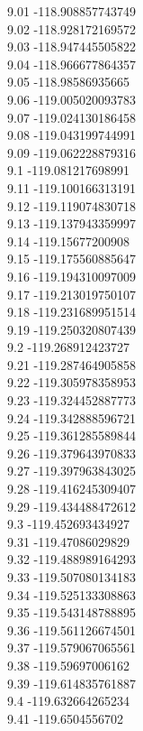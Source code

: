 {9.01	-118.908857743749\\
9.02	-118.928172169572\\
9.03	-118.947445505822\\
9.04	-118.966677864357\\
9.05	-118.98586935665\\
9.06	-119.005020093783\\
9.07	-119.024130186458\\
9.08	-119.043199744991\\
9.09	-119.062228879316\\
9.1	-119.081217698991\\
9.11	-119.100166313191\\
9.12	-119.119074830718\\
9.13	-119.137943359997\\
9.14	-119.15677200908\\
9.15	-119.175560885647\\
9.16	-119.194310097009\\
9.17	-119.213019750107\\
9.18	-119.231689951514\\
9.19	-119.250320807439\\
9.2	-119.268912423727\\
9.21	-119.287464905858\\
9.22	-119.305978358953\\
9.23	-119.324452887773\\
9.24	-119.342888596721\\
9.25	-119.361285589844\\
9.26	-119.379643970833\\
9.27	-119.397963843025\\
9.28	-119.416245309407\\
9.29	-119.434488472612\\
9.3	-119.452693434927\\
9.31	-119.47086029829\\
9.32	-119.488989164293\\
9.33	-119.507080134183\\
9.34	-119.525133308863\\
9.35	-119.543148788895\\
9.36	-119.561126674501\\
9.37	-119.579067065561\\
9.38	-119.59697006162\\
9.39	-119.614835761887\\
9.4	-119.632664265234\\
9.41	-119.6504556702\\
}
